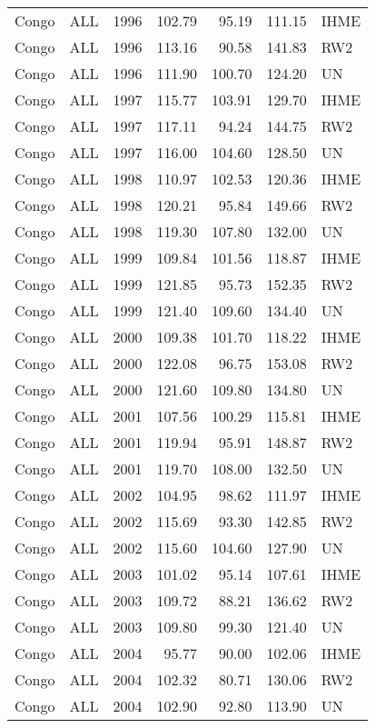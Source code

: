 \begin{longtable}{lllrrrl}
  Congo & ALL & 1996 & 102.79 & 95.19 & 111.15 & IHME \\ 
  Congo & ALL & 1996 & 113.16 & 90.58 & 141.83 & RW2 \\ 
  Congo & ALL & 1996 & 111.90 & 100.70 & 124.20 & UN \\ 
  Congo & ALL & 1997 & 115.77 & 103.91 & 129.70 & IHME \\ 
  Congo & ALL & 1997 & 117.11 & 94.24 & 144.75 & RW2 \\ 
  Congo & ALL & 1997 & 116.00 & 104.60 & 128.50 & UN \\ 
  Congo & ALL & 1998 & 110.97 & 102.53 & 120.36 & IHME \\ 
  Congo & ALL & 1998 & 120.21 & 95.84 & 149.66 & RW2 \\ 
  Congo & ALL & 1998 & 119.30 & 107.80 & 132.00 & UN \\ 
  Congo & ALL & 1999 & 109.84 & 101.56 & 118.87 & IHME \\ 
  Congo & ALL & 1999 & 121.85 & 95.73 & 152.35 & RW2 \\ 
  Congo & ALL & 1999 & 121.40 & 109.60 & 134.40 & UN \\ 
  Congo & ALL & 2000 & 109.38 & 101.70 & 118.22 & IHME \\ 
  Congo & ALL & 2000 & 122.08 & 96.75 & 153.08 & RW2 \\ 
  Congo & ALL & 2000 & 121.60 & 109.80 & 134.80 & UN \\ 
  Congo & ALL & 2001 & 107.56 & 100.29 & 115.81 & IHME \\ 
  Congo & ALL & 2001 & 119.94 & 95.91 & 148.87 & RW2 \\ 
  Congo & ALL & 2001 & 119.70 & 108.00 & 132.50 & UN \\ 
  Congo & ALL & 2002 & 104.95 & 98.62 & 111.97 & IHME \\ 
  Congo & ALL & 2002 & 115.69 & 93.30 & 142.85 & RW2 \\ 
  Congo & ALL & 2002 & 115.60 & 104.60 & 127.90 & UN \\ 
  Congo & ALL & 2003 & 101.02 & 95.14 & 107.61 & IHME \\ 
  Congo & ALL & 2003 & 109.72 & 88.21 & 136.62 & RW2 \\ 
  Congo & ALL & 2003 & 109.80 & 99.30 & 121.40 & UN \\ 
  Congo & ALL & 2004 & 95.77 & 90.00 & 102.06 & IHME \\ 
  Congo & ALL & 2004 & 102.32 & 80.71 & 130.06 & RW2 \\ 
  Congo & ALL & 2004 & 102.90 & 92.80 & 113.90 & UN \\ 

\end{longtable}
